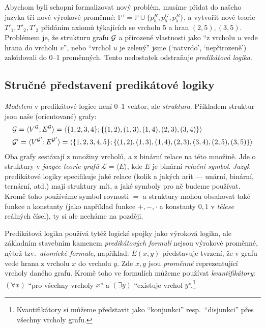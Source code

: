 Abychom byli schopni formalizovat nový problém, musíme přidat do našeho jazyka tři nové výrokové proměnné: \(\mathbb P'=\mathbb P \cup \{ p_5^R,p_5^G,p_5^B\} \), a vytvořit nové teorie \( T'_1, T'_2, T'_3 \) přidáním axiomů týkajících se vrcholu 5 a hran \( (2, 5), (3,5) \). Problémem je, že strukturu grafu \( \mathcal{G} \) a přirozené vlastnosti jako ``z vrcholu \(u\) vede hrana do vrcholu \(v\)'', nebo ``vrchol \(u\) je zelený'' jsme (`natvrdo', `nepřirozeně') zakódovali do 0--1 proměnných. Tento nedostatek odstraňuje \emph{predikátová logika}.

\subsection{Stručné představení predikátové logiky}

\emph{Modelem} v predikátové logice není 0--1 vektor, ale \emph{struktura}. Příkladem struktur jsou naše (orientované) grafy:
\begin{align*}
    &\mathcal{G} = \langle V^{\mathcal{G}}; E^{\mathcal{G}} \rangle = \langle \{1,2,3,4\}; \{(1,2),(1,3),(1,4),(2,3),(3,4)\} \rangle \\ 
    &\mathcal{G}' = \langle V^{\mathcal{G}'}; E^{\mathcal{G}'} \rangle = \langle \{1,2,3,4,5\}; \{(1,2),(1,3),(1,4),(2,3),(3,4),(2,5),(3,5)\} \rangle
\end{align*}
Oba grafy sestávají z množiny vrcholů, a z binární relace na této množině. Jde o struktury v \emph{jazyce teorie grafů} \( \mathcal L=\langle E \rangle \), kde \(E\) je binární \emph{relační symbol}. \emph{Jazyk} predikátové logiky specifikuje jaké relace (kolik a jakých arit --- unární, binární, ternární, atd.) mají struktury mít, a jaké symboly pro ně budeme používat. Kromě toho používáme symbol rovnosti \(=\) a struktury mohou obsahovat také funkce a konstanty (jako například funkce \( +,-,\cdot \) a konstanty $0,1$ v \emph{tělese} reálných čísel), ty si ale necháme na později.

Predikátová logika používá tytéž logické spojky jako výroková logika, ale základním stavebním kamenem \emph{predikátových formulí} nejsou výrokové proměnné, nýbrž tzv.\ \emph{atomické formule}, například: \( E(x,y) \) představuje tvrzení, že v grafu vede hrana z vrcholu \(x\) do vrcholu \(y\). Zde \(x,y\) jsou \emph{proměnné} reprezentující vrcholy daného grafu. Kromě toho ve formulích můžeme používat \emph{kvantifikátory}: \( (\forall x) \) ``pro všechny vrcholy \(x\)'' a \( (\exists y) \) ``existuje vrchol \(y\)''.\footnote{Kvantifikátory si můžeme představit jako ``konjunkci'' resp.\ ``disjunkci'' přes všechny vrcholy grafu.} 

